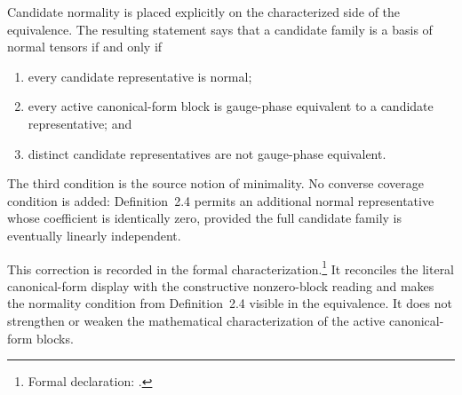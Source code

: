 \documentclass{article}
\begin{document}
Candidate normality is placed explicitly on the characterized side of the
equivalence. The resulting statement says that a candidate family is a basis
of normal tensors if and only if
\begin{enumerate}
    \item every candidate representative is normal;
    \item every active canonical-form block is gauge-phase equivalent to a
          candidate representative; and
    \item distinct candidate representatives are not gauge-phase equivalent.
\end{enumerate}
The third condition is the source notion of minimality. No converse coverage
condition is added: Definition~2.4 permits an additional normal representative
whose coefficient is identically zero, provided the full candidate family is
eventually linearly independent.

This correction is recorded in the formal characterization.\footnote{Formal
declaration:
.}
It reconciles the literal canonical-form display with the constructive
nonzero-block reading and makes the normality condition from Definition~2.4
visible in the equivalence. It does not strengthen or weaken the mathematical
characterization of the active canonical-form blocks.



\end{document}

